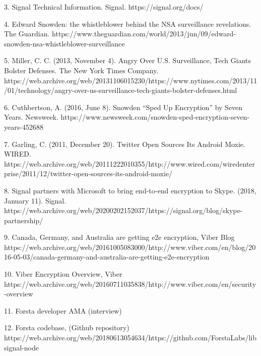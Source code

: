 \documentclass[12pt]{article}
\begin{document}
3. Signal Technical Information. Signal. https://signal.org/docs/

4. Edward Snowden: the whistleblower behind the NSA surveillance revelations. The Guardian. https://www.theguardian.com/world/2013/jun/09/edward-snowden-nsa-whistleblower-surveillance

5. Miller, C. C. (2013, November 4). Angry Over U.S. Surveillance, Tech Giants Bolster Defenses. The New York Times Company. https://web.archive.org/web/20131106015230/https://www.nytimes.com/2013/11/01/technology/angry-over-us-surveillance-tech-giants-bolster-defenses.html

6. Cuthbertson, A. (2016, June 8). Snowden “Sped Up Encryption” by Seven Years. Newsweek. https://www.newsweek.com/snowden-sped-encryption-seven-years-452688

7. Garling, C. (2011, December 20). Twitter Open Sources Its Android Moxie. WIRED. https://web.archive.org/web/20111222010355/http://www.wired.com/wiredenterprise/2011/12/twitter-open-sources-its-android-moxie/

8. Signal partners with Microsoft to bring end-to-end encryption to Skype. (2018, January 11). Signal. https://web.archive.org/web/20200202152037/https://signal.org/blog/skype-partnership/

9. Canada, Germany, and Australia are getting e2e encryption, Viber Blog https://web.archive.org/web/20161005083000/http://www.viber.com/en/blog/2016-05-03/canada-germany-and-australia-are-getting-e2e-encryption

10. Viber Encryption Overview, Viber https://web.archive.org/web/20160711035838/http://www.viber.com/en/security-overview 

11. Forsta developer AMA (interview) %

12. Forsta codebase, (Github repository) https://web.archive.org/web/20180613054634/https://github.com/ForstaLabs/libsignal-node

\printbibliography
\end{document}
